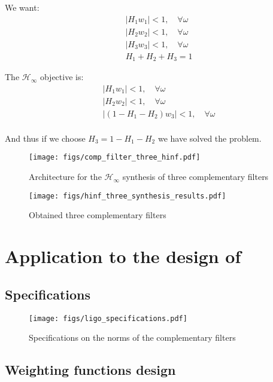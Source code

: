 \documentclass[9pt, technote, a4paper]{ieeeconf}
\begin{document}
We want:
\begin{align*}
  & |H_1 w_1| < 1, \quad \forall\omega\\
  & |H_2 w_2| < 1, \quad \forall\omega\\
  & |H_3 w_3| < 1, \quad \forall\omega\\
  & H_1 + H_2 + H_3 = 1
\end{align*}

The \(\mathcal{H}_\infty\) objective is:
\begin{align*}
  & |H_1 w_1| < 1, \quad \forall\omega\\
  & |H_2 w_2| < 1, \quad \forall\omega\\
  & |(1 - H_1 - H_2) w_3| < 1, \quad \forall\omega\\
\end{align*}

And thus if we choose \(H_3 = 1 - H_1 - H_2\) we have solved the problem.

\begin{figure}[htbp]
\centering
\texttt{[image: figs/comp\_filter\_three\_hinf.pdf]}
\caption{\label{fig:comp_filter_three_hinf}
Architecture for the \(\mathcal{H}_\infty\) synthesis of three complementary filters}
\end{figure}

\begin{figure}[htbp]
\centering
\texttt{[image: figs/hinf\_three\_synthesis\_results.pdf]}
\caption{\label{fig:hinf_three_synthesis_results}
Obtained three complementary filters}
\end{figure}

\section{Application to the design of}
\label{sec:orgdde45d9}
\label{sec:application_ligo}

\subsection{Specifications}
\label{sec:org42c5fdc}
\label{sec:ligo_specifications}

\begin{figure}[htbp]
\centering
\texttt{[image: figs/ligo\_specifications.pdf]}
\caption{\label{fig:ligo_specifications}
Specifications on the norms of the complementary filters}
\end{figure}

\subsection{Weighting functions design}
\label{sec:orgd835d49}
\label{sec:ligo_weights}
\end{document}
